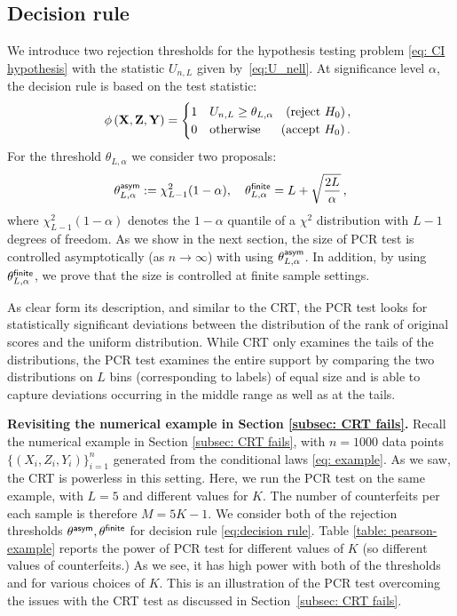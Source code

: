 \documentclass[11pt]{article}
\def\bX{\mathbf{X}}
\def\bY{\mathbf{Y}}
\def\bZ{\mathbf{Z}}
\begin{document}
\subsection{Decision rule} We introduce two rejection thresholds for the hypothesis testing problem \eqref{eq: CI hypothesis} with the statistic $U_{n,L}$ given by~\eqref{eq:U_nell}. At significance level $\alpha$, the decision rule is based on the test statistic:
\begin{equation}\label{eq:decision rule}
\phi\left(\bX,\bZ,\bY\right)=\begin{cases} 1 & U_{n,L}\geq \th_{L,\alpha}\quad (\text{reject } H_0)\,,\\
	0&  \text{otherwise}\quad ~~(\text{accept }H_0)\,. \
\end{cases}
\end{equation}
For the threshold $\theta_{L,\alpha}$ we consider two proposals:
\begin{align}\label{eq:thresholds}
 \theta_{L,\alpha}^{\mathsf{asym}}:= \chi^2_{L-1}(1-\alpha), 
 \quad \theta_{L,\alpha}^{\mathsf{finite}}=L+\sqrt{\frac{2L}{\alpha}}\,,
 \end{align}
 where $\chi^2_{L-1}(1-\alpha)$
denotes the $1-\alpha$ quantile of a $\chi^2$ distribution with $L-1$ degrees of freedom.
As we show in the next section, the size of PCR test is controlled asymptotically (as $n\to \infty$) with using $\theta_{L,\alpha}^{\mathsf{asym}}$. In addition, by using $\theta_{L,\alpha}^{\mathsf{finite}}$, we prove that the size is controlled at finite sample settings.


As clear form its description, and similar to the CRT, the PCR test looks for statistically significant deviations between the distribution of the rank of original scores and the uniform distribution. While CRT only examines the tails of the distributions, the PCR test examines the entire support by comparing the two distributions on $L$ bins (corresponding to labels) of equal size and is able to capture deviations occurring in the middle range as well as at the tails.
\bigskip

 \noindent
 \textbf{Revisiting the numerical example in Section \ref{subsec: CRT fails}. }
Recall the numerical example in Section \ref{subsec: CRT fails}, with $n=1000$ data points $\{(X_i,Z_i,Y_i)\}_{i=1}^n$ generated from the conditional laws \eqref{eq: example}. As we saw, the CRT is powerless in this setting. Here, we run the PCR test on the same example, with $L=5$ and different values for $K$.  The number of counterfeits per each sample is therefore $M=5K-1$. We consider both of the rejection thresholds $\theta^{\mathsf{asym}},\theta^{\mathsf{finite}}$ for decision rule \eqref{eq:decision rule}. Table \ref{table: pearson-example} reports the power of PCR test for different values of $K$ (so different values of counterfeits.) As we see, it has high power with both of the thresholds and for various choices of $K$. This is an illustration of the PCR test overcoming the issues with the CRT test as discussed in Section~\ref{subsec: CRT fails}.
\end{document}
